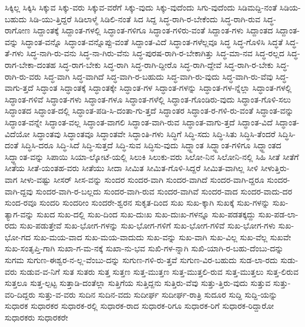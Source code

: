 {ಸಿಕ್ಕಿಲ್ಲ
ಸಿಕ್ಕಿಸಿ
ಸಿಕ್ಕುವ
ಸಿಕ್ಕು-ವರು
ಸಿಕ್ಕುವ-ವರೆಗೆ
ಸಿಕ್ಕು-ವುದು
ಸಿಕ್ಕು-ವುದೆಂದು
ಸಿಗು-ವುದೆಂದು
ಸಿಡಿಮದ್ದಿ-ನಂತೆ
ಸಿಡಿಯ-ಬಹುದು
ಸಿಡಿ-ಯು-ತ್ತಿದ್ದರೆ
ಸಿಡಿಲಾಳ್ಮೆ
ಸಿಡಿಲಿ-ನಂತೆ
ಸಿದ
ಸಿದ್ದ
ಸಿದ್ಧ-ರಾಗಿ-ರ-ಬೇಕೆಂದು
ಸಿದ್ಧ-ರಾಗಿ-ರುವ
ಸಿದ್ಧ-ರಾಗೋಣ
ಸಿದ್ದಾಂತಕ್ಕೆ
ಸಿದ್ದಾಂತ-ಗಳಲ್ಲಿ
ಸಿದ್ಧಾಂತ-ಗಳಿಗೂ
ಸಿದ್ಧಾಂತ-ಗಳಿರು-ವಂತೆ
ಸಿದ್ದಾಂತ-ಗಳು
ಸಿದ್ದಾಂತದ
ಸಿದ್ದಾಂತ-ವನ್ನು
ಸಿದ್ಧಾಂತ-ವನ್ನೊ
ಸಿದ್ಧಾಂತ-ವನ್ನೊಪ್ಪು-ವಂತೆ
ಸಿದ್ದಾಂತ-ವಿದೆ
ಸಿದ್ಧಾಂತ-ಗಳೆಲ್ಲವೂ
ಸಿದ್ಧ
ಸಿದ್ಧ-ಗೊಳಿಸಿ
ಸಿದ್ಧತೆ
ಸಿದ್ಧ-ತೆ-ಗಳು
ಸಿದ್ಧ-ನಾಗಿ-ರು-ವನು
ಸಿದ್ಧ-ನಾ-ಗಿರು-ವೆನು
ಸಿದ್ಧ-ಪುರಷ-ರಾಗಿ-ರ-ಬೇಕಾಗಿತ್ತು
ಸಿದ್ಧ-ಮಾ-ನವ
ಸಿದ್ಧ-ರಲ್ಲದ
ಸಿದ್ಧ-ರಾಗ-ಬೇಕಾ-ದಂತಹ
ಸಿದ್ಧ-ರಾಗ-ಬೇಕು
ಸಿದ್ಧ-ರಾಗಿ
ಸಿದ್ಧ-ರಾಗಿ-ದ್ದೀರೊ
ಸಿದ್ಧ-ರಾಗಿ-ದ್ದೇವೆ
ಸಿದ್ಧ-ರಾಗಿ-ರ-ಬೇಕು
ಸಿದ್ಧ-ರಾಗಿ-ರು-ವರು
ಸಿದ್ಧ-ವಾಗಿ
ಸಿದ್ಧ-ವಾಗಿದೆ
ಸಿದ್ಧ-ವಾಗಿ-ರ-ಬಹುದು
ಸಿದ್ಧ-ವಾಗಿ-ರು-ವುದು
ಸಿದ್ಧ-ವಾಗಿ-ರು-ವೆವು
ಸಿದ್ಧ-ವಾಗು-ತ್ತದೆ
ಸಿದ್ಧಾಂತ
ಸಿದ್ಧಾಂತಕ್ಕೆ
ಸಿದ್ಧಾಂತಕ್ಕೇ
ಸಿದ್ಧಾಂತ-ಗಳ
ಸಿದ್ಧಾಂತ-ಗಳನ್ನು
ಸಿದ್ಧಾಂತ-ಗಳ-ನ್ನೆಲ್ಲಾ
ಸಿದ್ಧಾಂತ-ಗಳಲ್ಲಿ
ಸಿದ್ಧಾಂತ-ಗಳಿವೆ
ಸಿದ್ಧಾಂತ-ಗಳು
ಸಿದ್ಧಾಂತ-ಗಳೂ
ಸಿದ್ಧಾಂತ-ಗಳೆಲ್ಲಿ
ಸಿದ್ಧಾಂತ-ಗೊಂಡಿರು-ವುದು
ಸಿದ್ಧಾಂತ-ಗೊಳಿ-ಸಲು
ಸಿದ್ಧಾಂತದ
ಸಿದ್ಧಾಂತ-ದಲ್ಲಿ
ಸಿದ್ಧಾಂತ-ಪಡಿ-ಸಿ-ದಂತಾ-ಗು-ತ್ತದೆ
ಸಿದ್ಧಾಂತರ
ಸಿದ್ಧಾಂತ-ರ-ಗಳಿ-ರು-ವಂತೆ
ಸಿದ್ಧಾಂತ-ವನ್ನು
ಸಿದ್ಧಾಂತ-ವನ್ನೇ
ಸಿದ್ಧಾಂತ-ವಲ್ಲ
ಸಿದ್ಧಾಂತ-ವಾಗಲಿ
ಸಿದ್ಧಾಂತ-ವಾಗಿ-ರುವ
ಸಿದ್ಧಾಂತ-ವಾಗು-ತ್ತದೆ
ಸಿದ್ಧಾಂತ-ವಿದೆ
ಸಿದ್ಧಾಂತ-ವಿದೆಯೋ
ಸಿದ್ಧಾಂತವು
ಸಿದ್ಧಾಂತವೂ
ಸಿದ್ಧಾಂತವೇ
ಸಿದ್ಧಾಂತಿ-ಗಳು
ಸಿದ್ಧಿಗೆ
ಸಿದ್ಧಿ-ಸದು
ಸಿದ್ಧಿ-ಸಿತು
ಸಿದ್ಧಿಸಿ-ತೆಂದರೆ
ಸಿದ್ಧಿಸಿ-ದಂತೆ
ಸಿದ್ಧಿಸಿ-ದರೂ
ಸಿದ್ಧಿ-ಸಿದೆ
ಸಿದ್ಧಿ-ಸುತ್ತದೆ
ಸಿದ್ಧಿ-ಸುವ
ಸಿದ್ಧಿಸು-ವುದು
ಸಿದ್ಧ್ದಾಂತ
ಸಿದ್ಧ್ದಾಂತ-ಗಳಿಗೂ
ಸಿದ್ಧ್ದಾಂತದ
ಸಿದ್ಧ್ದಾಂತ-ವನ್ನು
ಸಿಪಾಯಿ
ಸಿಯಾ-ಲ್ಕೋಟೆ-ಯಲ್ಲಿ
ಸಿಲುಕಿ
ಸಿಲುಕು-ವರು
ಸಿಲೋ-ನಿನ
ಸಿಲೋನಿ-ನಲ್ಲಿ
ಸಿಹಿ
ಸೀತೆ
ಸೀತೆಗೆ
ಸೀತೆಯ
ಸೀತೆ-ಯಂತಹ-ವರು
ಸೀತೆಯು
ಸೀದಾ
ಸೀಮಿತ
ಸೀಮಿತ-ಗೊಳಿ-ಸಿದ್ದರೆ
ಸೀಮಿತ-ವಾಗಿಲ್ಲ
ಸೀಳಿ
ಸೀಳುತ್ತಿರು-ವಾಗ
ಸೀಳು-ವಷ್ಟು
ಸೀಸರ್
ಸೀಸ-ವನ್ನು
ಸುಂದರ
ಸುಂದರ-ವಾಗಿ
ಸುಂದರ-ವಾಗಿದೆ
ಸುಂದರ-ವಾಗಿ-ದ್ದರೂ
ಸುಂದರ-ವಾಗಿ-ದ್ದವು
ಸುಂದರ-ವಾಗಿ-ರ-ಬಲ್ಲದು
ಸುಂದರ-ವಾಗಿ-ರುವ
ಸುಂದರ-ವಾಗಿವೆ
ಸುಂದರ-ವಾದ
ಸುಂದರ-ವಾದು-ದರ
ಸುಂದ-ರವೂ
ಸುಂದರಿ
ಸುಂದರೀಂ
ಸುಂದರೇ-ಶ್ವರನ
ಸುಕೃತ-ದಿಂದ
ಸುಖ
ಸುಖ-ಕ್ಕಾಗಿ
ಸುಖಕ್ಕೆ
ಸುಖ-ಗಳನ್ನು
ಸುಖ-ತ್ಯಾಗ-ವನ್ನು
ಸುಖದ
ಸುಖ-ದಲ್ಲಿ
ಸುಖ-ದಿಂದ
ಸುಖ-ದುಃಖ
ಸುಖ-ದುಃಖ-ಗಳನ್ನೂ
ಸುಖ-ಪಡತಕ್ಕದ್ದು
ಸುಖ-ಪಡ-ಲಾ-ರದು
ಸುಖ-ಪಡುತ್ತೇವೆ
ಸುಖ-ಭೋಗ-ಗಳನ್ನು
ಸುಖ-ಭೋಗ-ಗಳಿಗೆ
ಸುಖ-ಭೋಗ-ಗಳಿವೆ
ಸುಖ-ಭೋಗ-ಗಳು
ಸುಖ-ಭೋ-ಗದ
ಸುಖ-ಮಯ-ವಾದ
ಸುಖ-ಮಯ-ವಾದುದು
ಸುಖ-ವನ್ನು
ಸುಖ-ವಾಗಿ
ಸುಖ-ವಿಲ್ಲ
ಸುಖ-ವೆಲ್ಲ
ಸುಖವೇ
ಸುಖ-ಸಂತೃಪ್ತಿ-ಗಾಗಿ
ಸುಖಾ-ಗ-ಮ-ನಕ್ಕೆ
ಸುಖಾ-ನು-ಭವ
ಸುಖಿ-ಗಳ-ನ್ನಾಗಿ
ಸುಖಿ-ಯಾಗಿ-ರ-ಬಹು-ದೆಂಬು-ದನ್ನು
ಸುಗಮ
ಸುಗುಣ-ಈಶ್ವರ-ನ-ಲ್ಲ-ವೆಂಬು-ದನ್ನು
ಸುಗುಣ-ಗಳಿ-ರು-ತ್ತವೆ
ಸುಗುಣ-ವಿರ-ಬಹುದು
ಸುಡ-ಲಾ-ರದು
ಸುಡು-ವರು
ಸುಡುವ-ವ-ನಿಗೆ
ಸುತ
ಸುತರು
ಸುತ್ತ
ಸುತ್ತಣ
ಸುತ್ತ-ಮುತ್ತಣ
ಸುತ್ತ-ಮುತ್ತಲಿ-ರುವ
ಸುತ್ತ-ಮುತ್ತಲು
ಸುತ್ತ-ಲಿರುವ
ಸುತ್ತಲೂ
ಸುತ್ತ-ಲ್ಪಟ್ಟ
ಸುತ್ತಾಡಿ-ದಂತೆಲ್ಲಾ
ಸುತ್ತಿಗೆಯ
ಸುತ್ತಿದ್ದನು
ಸುತ್ತಿರು-ವೆವು
ಸುತ್ತು-ತ್ತಿರು-ವುದು
ಸುತ್ತುವ
ಸುತ್ತು-ವರಿ-ದಿದ್ದರು
ಸುತ್ತು-ವ-ವರು
ಸುದಿನ
ಸುದಿನ-ವದು
ಸುದೀರ್ಘ
ಸುದೀರ್ಘ-ರಾತ್ರಿ
ಸುದೂರ
ಸುದ್ದಿ
ಸುದ್ದಿ-ಯನ್ನು
ಸುಧಾರಕ
ಸುಧಾರಕರ
ಸುಧಾರಕ-ರಲ್ಲಿ
ಸುಧಾರಕ-ರಾದ
ಸುಧಾರಕ-ರಿಗೂ
ಸುಧಾರಕ-ರಿಗೆ
ಸುಧಾರಕ-ರಿದ್ದಾರೋ
ಸುಧಾರಕರು
ಸುಧಾರಕರೇ
}
